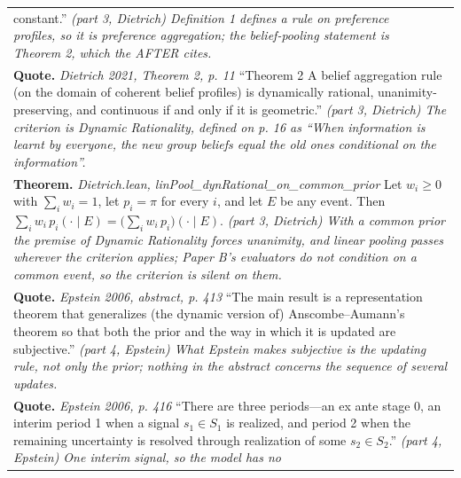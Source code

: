\documentclass[10pt]{article}
\theoremstyle{definition}
\newlength{\fullw}\setlength{\fullw}{25.9cm}
\begin{document}
{\begin{longtable}{|p{0.9cm}|p{12.2cm}|p{12.2cm}|}
{constant.'' \newline \textit{(part 3, Dietrich) Definition 1 defines a rule on preference
profiles, so it is preference aggregation; the belief-pooling statement is
Theorem 2, which the AFTER cites.}} \\
\multicolumn{3}{|p{\fullw}|}{\textbf{Quote.} \textit{Dietrich 2021, Theorem 2, p. 11} \newline ``Theorem 2 A belief aggregation rule (on the domain of coherent
belief profiles) is dynamically rational, unanimity-preserving, and continuous
if and only if it is geometric.'' \newline \textit{(part 3, Dietrich) The criterion is Dynamic Rationality, defined
on p. 16 as ``When information is learnt by everyone, the new group beliefs
equal the old ones conditional on the information''.}} \\
\multicolumn{3}{|p{\fullw}|}{\textbf{Theorem.} \textit{Dietrich.lean, linPool\_dynRational\_on\_common\_prior} \newline Let $w_i \ge 0$ with $\sum_i w_i = 1$, let $p_i = \pi$ for every
$i$, and let $E$ be any event. Then
$\sum_i w_i\, p_i(\cdot \mid E) = \big(\sum_i w_i\, p_i\big)(\cdot \mid E)$. \newline \textit{(part 3, Dietrich) With a common prior the premise of Dynamic
Rationality forces unanimity, and linear pooling passes wherever the criterion
applies; Paper B's evaluators do not condition on a common event, so the
criterion is silent on them.}} \\
\multicolumn{3}{|p{\fullw}|}{\textbf{Quote.} \textit{Epstein 2006, abstract, p. 413} \newline ``The main result is a representation theorem that generalizes
(the dynamic version of) Anscombe--Aumann's theorem so that both the prior and
the way in which it is updated are subjective.'' \newline \textit{(part 4, Epstein) What Epstein makes subjective is the
updating rule, not only the prior; nothing in the abstract concerns the
sequence of several updates.}} \\
\multicolumn{3}{|p{\fullw}|}{\textbf{Quote.} \textit{Epstein 2006, p. 416} \newline ``There are three periods---an ex ante stage 0, an interim period
1 when a signal $s_1 \in S_1$ is realized, and period 2 when the remaining
uncertainty is resolved through realization of some $s_2 \in S_2$.'' \newline \textit{(part 4, Epstein) One interim signal, so the model has no
}}
\end{longtable}}
\end{document}
